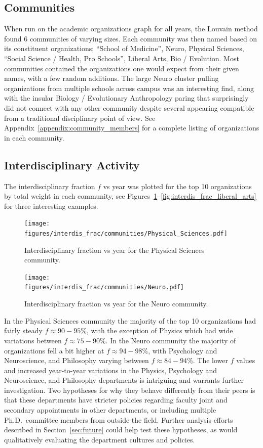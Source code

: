 \documentclass[notitlepage,aps,prd,nofootinbib]{revtex4-1}
\newcommand{\figures}{../outputs/plots}
\begin{document}
\subsection{Communities}
When run on the academic organizations graph for all years, the Louvain method found 6 communities of varying sizes. Each community was then named based on its constituent organizations; ``School of Medicine'', Neuro, Physical Sciences, ``Social Science / Health, Pro Schools'', Liberal Arts, Bio / Evolution. Most communities contained the organizations one would expect from their given names, with a few random additions. The large Neuro cluster pulling organizations from multiple schools across campus was an interesting find, along with the insular Biology / Evolutionary Anthropology paring that surprisingly did not connect with any other community despite several appearing compatible from a traditional disciplinary point of view. See Appendix~\ref{appendix:community_members} for a complete listing of organizations in each community.


\subsection{Interdisciplinary Activity}
The interdisciplinary fraction $f$ vs year was plotted for the top 10 organizations by total weight in each community, see Figures~\ref{fig:interdis_frac_physical_sciences}--\ref{fig:interdis_frac_liberal_arts} for three interesting examples.

\begin{figure}[!htb]\centering
  \texttt{[image: \\figures/interdis\_frac/communities/Physical\_Sciences.pdf]}
  \caption{Interdisciplinary fraction vs year for the Physical Sciences community.}
  \label{fig:interdis_frac_physical_sciences}
\end{figure}

\begin{figure}[!htb]\centering
  \texttt{[image: \\figures/interdis\_frac/communities/Neuro.pdf]}
  \caption{Interdisciplinary fraction vs year for the Neuro community.}
  \label{fig:interdis_frac_neuro}
\end{figure}

In the Physical Sciences community the majority of the top 10 organizations had fairly steady $f \approx 90-95\%$, with the exception of Physics which had wide variations between $f \approx 75-90\%$. In the Neuro community the majority of organizations fell a bit higher at $f \approx 94-98\%$, with Psychology and Neuroscience, and Philosophy varying between $f \approx 84-94\%$. The lower $f$ values and increased year-to-year variations in the Physics, Psychology and Neuroscience, and Philosophy departments is intriguing and warrants further investigation. Two hypotheses for why they behave differently from their peers is that these departments have stricter policies regarding faculty joint and secondary appointments in other departments, or including multiple Ph.D.\ committee members from outside the field. Further analysis efforts described in Section~\ref{sec:future} could help test these hypotheses, as would qualitatively evaluating the department cultures and policies.
\end{document}

